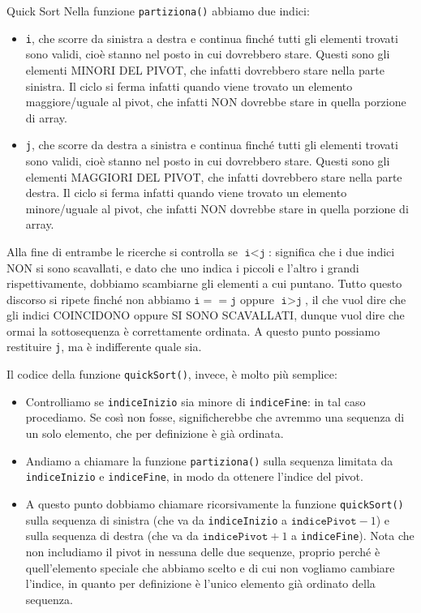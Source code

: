 \documentclass[12pt]{report}
\begin{document}
    \begin{algoritmo}{Quick Sort}{}
    	Nella funzione \texttt{partiziona()} abbiamo due indici:
    	\begin{itemize}
    		\item \texttt{i}, che scorre da sinistra a destra e continua finché tutti gli elementi trovati sono validi, cioè stanno nel posto in cui dovrebbero stare. Questi sono gli elementi MINORI DEL PIVOT, che infatti dovrebbero stare nella parte sinistra. Il ciclo si ferma infatti quando viene trovato un elemento maggiore/uguale al pivot, che infatti NON dovrebbe stare in quella porzione di array.
    		\item \texttt{j}, che scorre da destra a sinistra e continua finché tutti gli elementi trovati sono validi, cioè stanno nel posto in cui dovrebbero stare. Questi sono gli elementi MAGGIORI DEL PIVOT, che infatti dovrebbero stare nella parte destra. Il ciclo si ferma infatti quando viene trovato un elemento minore/uguale al pivot, che infatti NON dovrebbe stare in quella porzione di array.
    	\end{itemize}
    	
    	Alla fine di entrambe le ricerche si controlla se $\texttt{i} < \texttt{j}$: significa che i due indici NON si sono scavallati, e dato che uno indica i piccoli e l'altro i grandi rispettivamente, dobbiamo scambiarne gli elementi a cui puntano. Tutto questo discorso si ripete finché non abbiamo $\texttt{i} == \texttt{j}$ oppure $\texttt{i} > \texttt{j}$, il che vuol dire che gli indici COINCIDONO oppure SI SONO SCAVALLATI, dunque vuol dire che ormai la sottosequenza è correttamente ordinata. A questo punto possiamo restituire \texttt{j}, ma è indifferente quale sia.
    	
    	Il codice della funzione \texttt{quickSort()}, invece, è molto più semplice:
    	\begin{itemize}
    		\item Controlliamo se \texttt{indiceInizio} sia minore di \texttt{indiceFine}: in tal caso procediamo. Se così non fosse, significherebbe che avremmo una sequenza di un solo elemento, che per definizione è già ordinata.
    		\item Andiamo a chiamare la funzione \texttt{partiziona()} sulla sequenza limitata da \texttt{indiceInizio} e \texttt{indiceFine}, in modo da ottenere l'indice del pivot.
    		\item A questo punto dobbiamo chiamare ricorsivamente la funzione \texttt{quickSort()} sulla sequenza di sinistra (che va da \texttt{indiceInizio} a $\texttt{indicePivot} - 1$) e sulla sequenza di destra (che va da $\texttt{indicePivot} + 1$ a \texttt{indiceFine}). Nota che non includiamo il pivot in nessuna delle due sequenze, proprio perché è quell'elemento speciale che abbiamo scelto e di cui non vogliamo cambiare l'indice, in quanto per definizione è l'unico elemento già ordinato della sequenza.
    	\end{itemize}
    \end{algoritmo}
    
\end{document}

